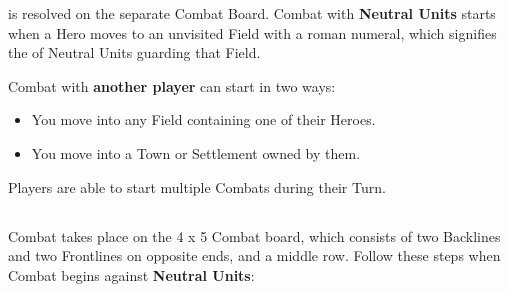 
\begin{multicols}{2}

 is resolved on the separate Combat Board.
Combat with \textbf{Neutral Units} starts when a Hero moves to an unvisited Field with a roman numeral, which signifies the  of Neutral Units guarding that Field.

Combat with \textbf{another player} can start in two ways:
\begin{itemize}
  \item You move into any Field containing one of their Heroes.
  \item You move into a Town or Settlement owned by them.
\end{itemize}
Players are able to start multiple Combats during their Turn.

\subsection*{}

Combat takes place on the 4 x 5 Combat board, which consists of two Backlines and two Frontlines on opposite ends, and a middle row.
Follow these steps when Combat begins against \textbf{Neutral Units}:


\end{multicols}
